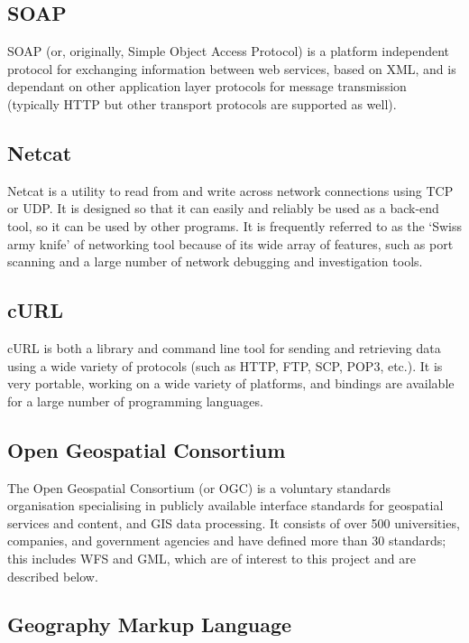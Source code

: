 \documentclass[a4paper, 12pt, twoside]{article}
\begin{document}
\subsection{SOAP}
\label{sec:bg_soap}

SOAP (or, originally, Simple Object Access Protocol) is a platform independent protocol for exchanging information between web services, based on XML, and is dependant on other application layer protocols for message transmission (typically HTTP but other transport protocols are supported as well).

\subsection{Netcat}
\label{sec:bg_netcat}

Netcat is a utility to read from and write across network connections using TCP or UDP. It is designed so that it can easily and reliably be used as a back-end tool, so it can be used by other programs. It is frequently referred to as the `Swiss army knife' of networking tool because of its wide array of features, such as port scanning and a large number of network debugging and investigation tools.

\subsection{cURL}
\label{sec:bg_curl}

cURL is both a library and command line tool for sending and retrieving data using a wide variety of protocols (such as HTTP, FTP, SCP, POP3, etc.). It is very portable, working on a wide variety of platforms, and bindings are available for a large number of programming languages.

\subsection{Open Geospatial Consortium}
\label{sec:bg_ogc}

The Open Geospatial Consortium (or OGC) is a voluntary standards organisation specialising in publicly available interface standards for geospatial services and content, and GIS data processing. It consists of over 500 universities, companies, and government agencies and have defined more than 30 standards; this includes WFS and GML, which are of interest to this project and are described below.

\subsection{Geography Markup Language}
\label{sec:bg_gml}
\end{document}
